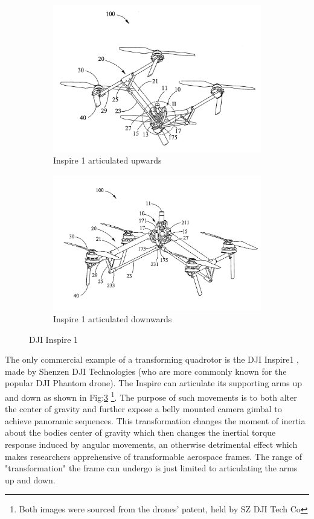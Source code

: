 \begin{figure}[htbp]
\centering
\begin{subfigure}{.5\textwidth}
\centering
\includegraphics[width=\textwidth]{figs/dji-inspire1}
\caption{Inspire 1 articulated upwards}
\label{fig:inspireup}
\end{subfigure}%
\begin{subfigure}{.5\textwidth}
\centering
\includegraphics[width=\textwidth]{figs/dji-inspire2}
\caption{Inspire 1 articulated downwards}
\label{fig:inspiredown}
\end{subfigure}
\caption{DJI Inspire 1}
\label{fig:inspire1}
\end{figure}
The only commercial example of a transforming quadrotor is the DJI Inspire1 \cite{inspire}, made by Shenzen DJI Technologies (who are more commonly known for the popular DJI Phantom drone). The Inspire can articulate its supporting arms up and down as shown in Fig:\ref{fig:inspire1} \footnote{Both images were sourced from the drones' patent, held by SZ DJI Tech Co\cite{djinspire}}. The purpose of such movements is to both alter the center of gravity and further expose a belly mounted camera gimbal to achieve panoramic sequences. This transformation changes the moment of inertia about the bodies center of gravity which then changes the inertial torque response induced by angular movements, an otherwise detrimental effect which makes researchers apprehensive of transformable aerospace frames. The range of "transformation" the frame can undergo is just limited to articulating the arms up and down.

